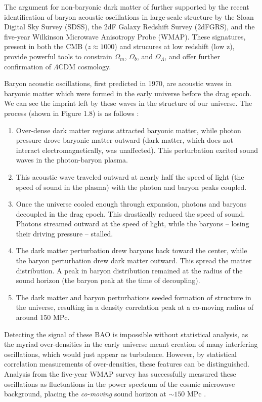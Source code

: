 \documentclass{report}
\begin{document}
The argument for non-baryonic dark matter of further supported by the recent identification of baryon acoustic oscillations in large-scale structure by the Sloan Digital Sky Survey (SDSS), the 2dF Galaxy Redshift Survey (2dFGRS), and the five-year Wilkinson Microwave Anisotropy Probe (WMAP). These signatures, present in both the CMB ($z \approx 1000$) and strucures at low redshift (low z), provide powerful tools to constrain $\Omega_{m}$, $\Omega_{b}$, and $\Omega_{\Lambda}$, and offer further confirmation of $\Lambda$CDM cosmology.

Baryon acoustic oscillations, first predicted in 1970, are acoustic waves in baryonic matter which were formed in the early universe before the drag epoch. We can see the imprint left by these waves in the structure of our universe. The process (shown in Figure 1.8) is as follows \cite{Eisenstein2005}:

\begin{enumerate}
\item Over-dense dark matter regions attracted baryonic matter, while photon pressure drove baryonic matter outward (dark matter, which does not interact electromagnetically, was unaffected). This perturbation excited sound waves in the photon-baryon plasma.
\item This acoustic wave traveled outward at nearly half the speed of light (the speed of sound in the plasma) with the photon and baryon peaks coupled.
\item Once the universe cooled enough through expansion, photons and baryons decoupled in the drag epoch. This drastically reduced the speed of sound. Photons streamed outward at the speed of light, while the baryons -- losing their driving pressure -- stalled.
\item The dark matter perturbation drew baryons back toward the center, while the baryon perturbation drew dark matter outward. This spread the matter distribution. A peak in baryon distribution remained at the radius of the sound horizon (the baryon peak at the time of decoupling).
\item The dark matter and baryon perturbations seeded formation of structure in the universe, resulting in a density correlation peak at a co-moving radius of around 150 MPc.
\end{enumerate}

Detecting the signal of these BAO is impossible without statistical analysis, as the myriad over-densities in the early universe meant creation of many interfering oscillations, which would just appear as turbulence. However, by statistical correlation measurements of over-densities, these features can be distinguished. Analysis from the five-year WMAP survey has successfully measured these oscillations as fluctuations in the power spectrum of the cosmic microwave background, placing the \emph{co-moving} sound horizon at $\sim 150$ MPc \cite{Komatsu2008}.
\end{document}
